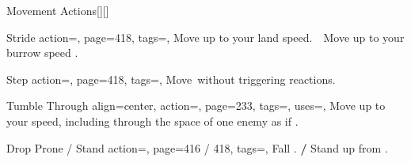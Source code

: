 \begin{PageBack}
\begin{Tables}{\backTableHeight}
        \TableSpace
        \begin{Table}{Movement Actions}[][]
            \begin{entry}{Stride}{%
                action=,
                page=418,
                tags=\Move,
            }
                Move up to your land speed.\hfill
                \;\,\Move\,
                Move up to your burrow speed .
            \end{entry}
            \begin{entry}{Step}{%
                action=,
                page=418,
                tags=\Move,
            }
                Move \,\Feet without triggering reactions.
            \end{entry}
            \begin{entry}{Tumble Through}{%
                align=center,
                action=,
                page=233,
                tags=\Move,
                uses=\AcrobaticsReflex,
            }
                Move up to your speed, including through the space of one enemy as if .\\
                \phant
            \end{entry}
            \breakLine
            \begin{entry}{Drop Prone / Stand}{%
                action=,
                page=416 / 418,
                tags=\Move,
            }
                Fall \Prone. \textbf{/} Stand up from \Prone.

\end{entry}
\end{Table}
\end{Tables}
\end{PageBack}

